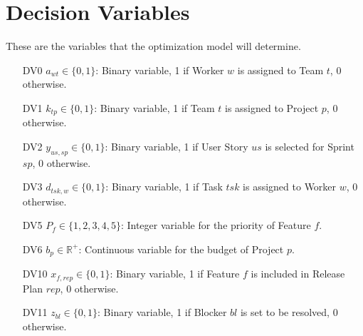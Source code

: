 \documentclass{article}
\begin{document}
\section{Decision Variables}
These are the variables that the optimization model will determine.
\begin{itemize}
    \item[DV0] $a_{wt} \in \{0, 1\}$: Binary variable, 1 if Worker $w$ is assigned to Team $t$, 0 otherwise.
    \item[DV1] $k_{tp} \in \{0, 1\}$: Binary variable, 1 if Team $t$ is assigned to Project $p$, 0 otherwise.
    \item[DV2] $y_{us,sp} \in \{0, 1\}$: Binary variable, 1 if User Story $us$ is selected for Sprint $sp$, 0 otherwise.
    \item[DV3] $d_{tsk,w} \in \{0, 1\}$: Binary variable, 1 if Task $tsk$ is assigned to Worker $w$, 0 otherwise.
    \item[DV5] $P_f \in \{1, 2, 3, 4, 5\}$: Integer variable for the priority of Feature $f$.
    \item[DV6] $b_p \in \mathbb{R}^+$: Continuous variable for the budget of Project $p$.
    \item[DV10] $x_{f,rep} \in \{0, 1\}$: Binary variable, 1 if Feature $f$ is included in Release Plan $rep$, 0 otherwise.
    \item[DV11] $z_{bl} \in \{0, 1\}$: Binary variable, 1 if Blocker $bl$ is set to be resolved, 0 otherwise.
\end{itemize}
\end{document}
